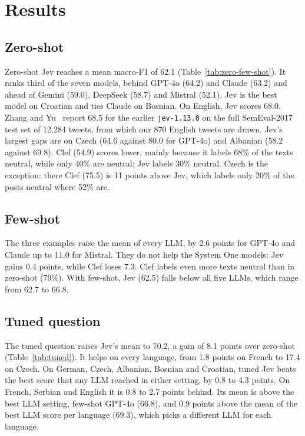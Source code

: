 \documentclass[sigconf]{acmart}
\begin{document}
\section{Results}



\subsection{Zero-shot}
Zero-shot Jev reaches a mean macro-F1 of 62.1 (Table~\ref{tab:zero-few-shot}). It ranks third of the seven models, behind GPT-4o (64.2) and Claude (63.2) and ahead of Gemini (59.0), DeepSeek (58.7) and Mistral (52.1). Jev is the best model on Croatian and ties Claude on Bosnian. On English, Jev scores 68.0. Zhang and Yu~\cite{zhang2026emojev} report 68.5 for the earlier \texttt{jev-1.13.0} on the full SemEval-2017 test set of 12,284 tweets, from which our 870 English tweets are drawn. Jev's largest gaps are on Czech (64.6 against 80.0 for GPT-4o) and Albanian (58.2 against 69.8). Clef (54.9) scores lower, mainly because it labels 68\% of the texts neutral, while only 40\% are neutral; Jev labels 30\% neutral. Czech is the exception: there Clef (75.5) is 11 points above Jev, which labels only 20\% of the posts neutral where 52\% are.

\subsection{Few-shot}
The three examples raise the mean of every LLM, by 2.6 points for GPT-4o and Claude up to 11.0 for Mistral. They do not help the System One models: Jev gains 0.4 points, while Clef loses 7.3. Clef labels even more texts neutral than in zero-shot (79\%). With few-shot, Jev (62.5) falls below all five LLMs, which range from 62.7 to 66.8.



\subsection{Tuned question}
The tuned question raises Jev's mean to 70.2, a gain of 8.1 points over zero-shot (Table~\ref{tab:tuned}). It helps on every language, from 1.8 points on French to 17.4 on Czech. On German, Czech, Albanian, Bosnian and Croatian, tuned Jev beats the best score that any LLM reached in either setting, by 0.8 to 4.3 points. On French, Serbian and English it is 0.8 to 2.7 points behind. Its mean is above the best LLM setting, few-shot GPT-4o (66.8), and 0.9 points above the mean of the best LLM score per language (69.3), which picks a different LLM for each language.
\end{document}
